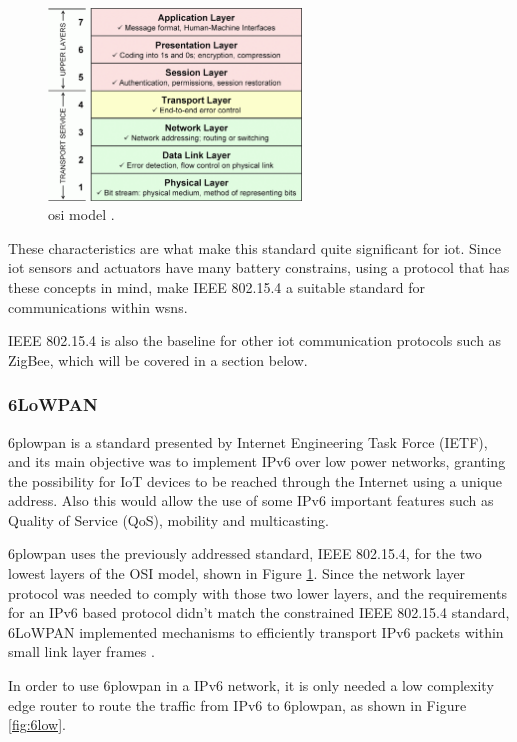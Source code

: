 \begin{figure}[H]
	\centering
	\includegraphics[width=0.6\textwidth]{figures/osi.png}
	\caption{\acf{osi} model \cite{Zikrillah}.}
	\label{fig:osi}
\end{figure}

These characteristics are what make this standard quite significant for \ac{iot}. Since \ac{iot} sensors and actuators have many battery constrains, using a protocol that has these concepts in mind, make IEEE 802.15.4 a suitable standard for communications within \ac{wsn}s.

IEEE 802.15.4 is also the baseline for other \ac{iot} communication protocols such as ZigBee, which will be covered in a section below.


\subsubsection{6LoWPAN}
\acf{6plowpan} is a standard presented by Internet Engineering Task Force (IETF), and its main objective was to implement IPv6 over low power networks, granting the possibility for IoT devices to be reached through the Internet using a unique address. Also this would allow the use of some IPv6 important features such as Quality of Service (QoS), mobility and multicasting.

\ac{6plowpan} uses the previously addressed standard, IEEE 802.15.4, for the two lowest layers of the OSI model, shown in Figure \ref{fig:osi}. Since the network layer protocol was needed to comply with those two lower layers, and the requirements for an IPv6 based protocol didn't match the constrained IEEE 802.15.4 standard, 6LoWPAN implemented mechanisms to efficiently transport IPv6 packets within small link layer frames \cite{chalappuram2016}. 

In order to use \ac{6plowpan} in a IPv6 network, it is only needed a low complexity edge router to route the traffic from IPv6 to \ac{6plowpan}, as shown in Figure \ref{fig:6low}. 

